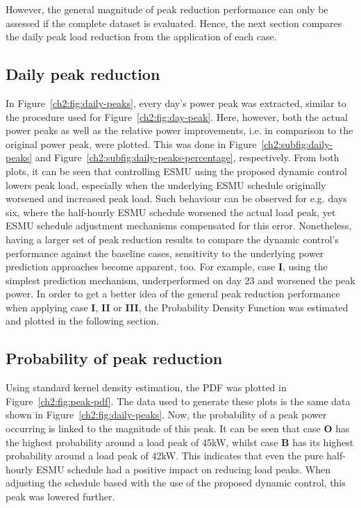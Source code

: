 

However, the general magnitude of peak reduction performance can only be assessed if the complete dataset is evaluated.
Hence, the next section compares the daily peak load reduction from the application of each case.

\subsection{Daily peak reduction}



In Figure~\ref{ch2:fig:daily-peaks}, every day's power peak was extracted, similar to the procedure used for Figure~\ref{ch2:fig:day-peak}.
Here, however, both the actual power peaks as well as the relative power improvements, i.e. in comparison to the original power peak, were plotted.
This was done in Figure~\ref{ch2:subfig:daily-peaks} and Figure~\ref{ch2:subfig:daily-peaks-percentage}, respectively.
From both plots, it can be seen that controlling ESMU using the proposed dynamic control lowers peak load, especially when the underlying ESMU schedule originally worsened and increased peak load.
Such behaviour can be observed for e.g. days six, where the half-hourly ESMU schedule worsened the actual load peak, yet ESMU schedule adjustment mechanisms compensated for this error.
Nonetheless, having a larger set of peak reduction results to compare the dynamic control's performance against the baseline cases, sensitivity to the underlying power prediction approaches become apparent, too.
For example, case \textbf{I}, using the simplest prediction mechanism, underperformed on day 23 and worsened the peak power.
In order to get a better idea of the general peak reduction performance when applying case \textbf{I}, \textbf{II} or \textbf{III}, the Probability Density Function was estimated and plotted in the following section.

\subsection{Probability of peak reduction}
\label{ch2:subsec:probability-of-peak-reduction}



Using standard kernel density estimation, the PDF was plotted in Figure~\ref{ch2:fig:peak-pdf}.
The data used to generate these plots is the same data shown in Figure~\ref{ch2:fig:daily-peaks}.
Now, the probability of a peak power occurring is linked to the magnitude of this peak.
It can be seen that case \textbf{O} has the highest probability around a load peak of 45kW, whilst case \textbf{B} has its highest probability around a load peak of 42kW.
This indicates that even the pure half-hourly ESMU schedule had a positive impact on reducing load peaks.
When adjusting the schedule based with the use of the proposed dynamic control, this peak was lowered further.

